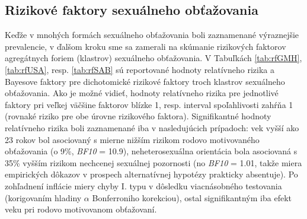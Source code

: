 \documentclass[
]{article}
\begin{document}
\hypertarget{rizikovuxe9-faktory-sexuuxe1lneho-obux165aux17eovania}{%
\subsection{Rizikové faktory sexuálneho obťažovania}\label{rizikovuxe9-faktory-sexuuxe1lneho-obux165aux17eovania}}

Keďže v mnohých formách sexuálneho obťažovania boli zaznamenané výraznejšie prevalencie, v ďalšom kroku sme sa zamerali na skúmanie rizikových faktorov agregátnych foriem (klastrov) sexuálneho obťažovania. V Tabuľkách \ref{tab:rfGMH}, \ref{tab:rfUSA}, resp. \ref{tab:rfSAB} sú reportované hodnoty relatívneho rizika a Bayesove faktory pre dichotomické rizikové faktory troch klastrov sexuálneho obťažovania. Ako je možné vidieť, hodnoty relatívneho rizika pre jednotlivé faktory pri veľkej väčšine faktorov blízke 1, resp. interval spoľahlivosti zahŕňa 1 (rovnaké riziko pre obe úrovne rizikového faktora). Signifikantné hodnoty relatívneho rizika boli zaznamenané iba v nasledujúcich prípadoch: vek vyšší ako 23 rokov bol asociovaný s mierne nižším rizikom rodovo motivovaného obťažovania (o 9\%, \emph{BF10} = 10.9), neheterosexuálna orientácia bola asociovaná s 35\% vyšším rizikom nechcenej sexuálnej pozornosti (no \emph{BF10} = 1.01, takže miera empirických dôkazov v prospech alternatívnej hypotézy prakticky absentuje). Po zohľadnení inflácie miery chyby I. typu v dôsledku viacnásobného testovania (korigovaním hladiny \(\alpha\) Bonferroniho korekciou), ostal signifikantným iba efekt veku pri rodovo motivovanom obťažovaní.
\end{document}
